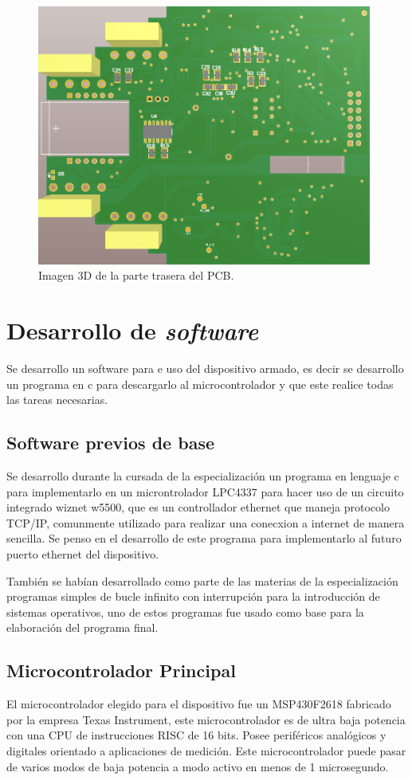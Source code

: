 \begin{figure}[htb]
	\centering
	\includegraphics[width=110mm,keepaspectratio]{Figures/PCBback.png}
	\caption{Imagen 3D de la parte trasera del PCB.}
	\label{fig:PCBbackk}
\end{figure}


\section{Desarrollo de \textit{software}}
Se desarrollo un software para e uso del dispositivo armado, es decir se desarrollo un programa en c para descargarlo al microcontrolador y que este realice todas las tareas necesarias.

\subsection{Software previos de base}
Se desarrollo durante la cursada de la especialización un programa en lenguaje c para implementarlo en un microntrolador LPC4337 para hacer uso de un circuito integrado wiznet w5500, que es un controllador ethernet que maneja protocolo TCP/IP, comunmente utilizado para realizar una conecxion a internet de manera sencilla. Se penso en el desarrollo de este programa para implementarlo al futuro puerto ethernet del dispositivo.

También se habían desarrollado como parte de las materias de la especialización programas simples de bucle infinito con interrupción para la introducción de sistemas operativos, uno de estos programas fue usado como base para la elaboración del programa final.


\subsection{Microcontrolador Principal}
El microcontrolador elegido para el dispositivo fue un MSP430F2618 fabricado por la empresa Texas Instrument, este microcontrolador es de ultra baja potencia con una CPU de instrucciones RISC de 16 bits. Posee periféricos analógicos y digitales orientado a aplicaciones de medición. Este microcontrolador puede pasar de varios modos de baja potencia a modo activo en menos de 1 microsegundo.


